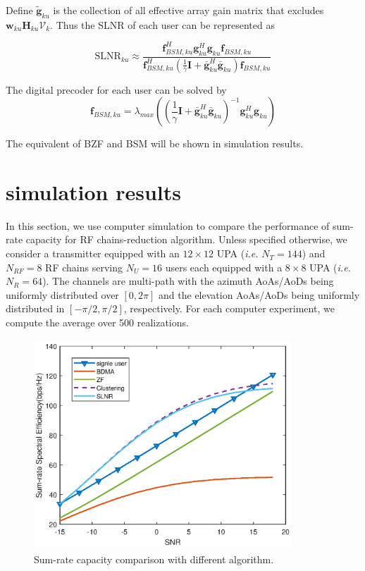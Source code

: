 \documentclass[conference]{IEEEtran}
\begin{document}
Define $\tilde{\bm{g}}_{ku}$ is the collection of all effective array gain matrix that excludes $\bm{w}_{ku} \bm{H}_{ku} \bm{\mathcal{V}}_k$. Thus the SLNR of each user can be represented as

\begin{equation}
\text{SLNR}_{ku} \approx \frac{\bm{f}_{BSM, ku}^H{\bm{g}}_{ku}^H{\bm{g}}_{ku} \bm{f}_{BSM, ku}}{\bm{f}_{BSM, ku}^H(\frac{1}{\gamma}\bm{I}+\bar{\bm{g}}_{ku}^H\bar{\bm{g}}_{ku})\bm{f}_{BSM, ku}}
\end{equation}

The digital precoder for each user can be solved by \cite{wang2012statistical}
\begin{equation}
	\bm{f}_{BSM,ku} = \lambda_{max}\left( \left(\frac{1}{\gamma}\bm{I}+\bar{\bm{g}}_{ku}^H\bar{\bm{g}}_{ku} \right)^{-1}{\bm{g}}_{ku}^H{\bm{g}}_{ku} \right)
\end{equation}

The equivalent of BZF and BSM  will be shown in simulation results.




\section{simulation results}
In this section, we use computer simulation to compare the performance of sum-rate capacity for RF chains-reduction algorithm. Unless specified otherwise, we consider a transmitter equipped with an $12\times 12$ UPA ({\em i.e.} $N_T=144$) and $N_{RF}=8$ RF chains serving $N_U=16$ users each equipped with a $8\times 8$ UPA ({\em i.e.} $N_R=64$). The channels are multi-path with the azimuth AoAs/AoDs being uniformly distributed over $[0, 2\pi]$ and the elevation AoAs/AoDs being uniformly distributed in $[-\pi/2, \pi/2]$, respectively. For each computer experiment, we compute the average over 500 realizations.

\begin{figure}[ht]
	\begin{center}
		\includegraphics[width=3.8in,height=3.1in]{Figure/comparison.eps}
		\caption{Sum-rate capacity comparison with different algorithm.}\label{fig:MultiuserGain}
	\end{center}
\end{figure}
\end{document}
